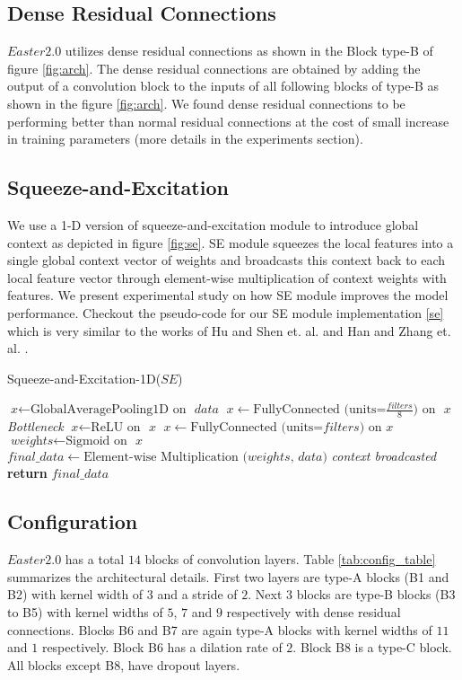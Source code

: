 \documentclass{article}
\begin{document}
\subsection{Dense Residual Connections}
$Easter2.0$ utilizes dense residual connections as shown in the Block type-B of figure \ref{fig:arch}. The dense residual connections\cite{li2019jasper} are obtained by adding the output of a convolution block to the inputs of all following blocks of type-B as shown in the figure \ref{fig:arch}. We found dense residual connections to be performing better than normal residual connections at the cost of small increase in training parameters (more details in the experiments section).

\subsection{Squeeze-and-Excitation}
We use a 1-D version of squeeze-and-excitation module to introduce global context as depicted in figure \ref{fig:se}. SE module squeezes the local features into a single global context vector of weights and broadcasts this context back to each local feature vector through element-wise multiplication of context weights with features. We present experimental study on how SE module improves the model performance. Checkout the pseudo-code for our SE module implementation \ref{se} which is very similar to the works of Hu and Shen et. al.\cite{hu2018squeeze} and Han and Zhang et. al. \cite{han2020contextnet}.

    
\begin{algorithm}
\caption{Squeeze-and-Excitation-1D($SE$)}\label{se}
\begin{algorithmic}[1]
\State $\textit{x} \gets \text{GlobalAveragePooling1D on }\textit{\ data}$
\State $\textit{x} \gets \text{FullyConnected (units=$\frac{filters}{8}$) on }\textit{\ x}$
\Comment \emph{Bottleneck}
\State $\textit{x} \gets \text{ReLU on }\textit{\ x}$
\State $\textit{x} \gets \text{FullyConnected (units=$filters$) on}\textit{\ x}$
\State $\textit{weights} \gets \text{Sigmoid on }\textit{\ x}$
\State $\textit{final\_data} \gets \text{Element-wise Multiplication ($weights$, $data$)}$
\Comment \emph{context broadcasted}
\State \textbf{return} {$final\_data$}
\EndProcedure
\end{algorithmic}
\end{algorithm}


\subsection{Configuration}
$Easter2.0$ has a total $14$ blocks of convolution layers. Table \ref{tab:config_table} summarizes the architectural details. First two layers are type-A blocks (B1 and B2) with kernel width of $3$ and a stride of $2$. Next $3$ blocks are type-B blocks (B3 to B5) with kernel widths of $5$, $7$ and $9$ respectively with dense residual connections. Blocks B6 and B7 are again type-A blocks with kernel widths of $11$ and $1$ respectively. Block B6 has a dilation rate of $2$. Block B8 is a type-C block. All blocks except B8, have dropout layers. 
\end{document}
